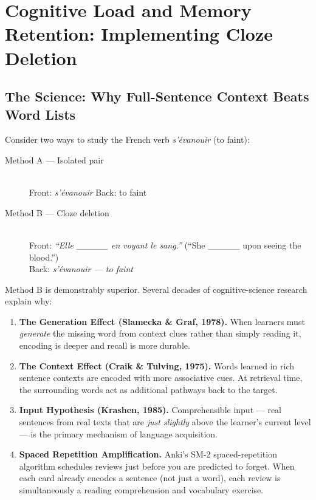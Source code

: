 \documentclass[12pt,oneside]{book}
\begin{document}
\chapter{Cognitive Load and Memory Retention: Implementing Cloze Deletion}
\label{ch:cloze}

\section{The Science: Why Full-Sentence Context Beats Word Lists}

Consider two ways to study the French verb \textit{s'évanouir} (to faint):

\begin{description}
  \item[Method A — Isolated pair] \hfill \\
    Front: \textit{s'évanouir} \quad Back: to faint

  \item[Method B — Cloze deletion] \hfill \\
    Front: \textit{``Elle \_\_\_\_\_ en voyant le sang.''}
    (``She \_\_\_\_\_ upon seeing the blood.'') \\
    Back: \textit{s'évanouir — to faint}
\end{description}

Method B is demonstrably superior. Several decades of cognitive-science research explain
why:

\begin{enumerate}
  \item \textbf{The Generation Effect (Slamecka \& Graf, 1978).} When learners must
    \textit{generate} the missing word from context clues rather than simply reading it,
    encoding is deeper and recall is more durable.

  \item \textbf{The Context Effect (Craik \& Tulving, 1975).} Words learned in rich
    sentence contexts are encoded with more associative cues. At retrieval time, the
    surrounding words act as additional pathways back to the target.

  \item \textbf{Input Hypothesis (Krashen, 1985).} Comprehensible input — real sentences
    from real texts that are \textit{just slightly} above the learner's current level —
    is the primary mechanism of language acquisition.

  \item \textbf{Spaced Repetition Amplification.} Anki's SM-2 spaced-repetition algorithm
    schedules reviews just before you are predicted to forget. When each card already
    encodes a sentence (not just a word), each review is simultaneously a reading
    comprehension and vocabulary exercise.
\end{enumerate}
\end{document}
